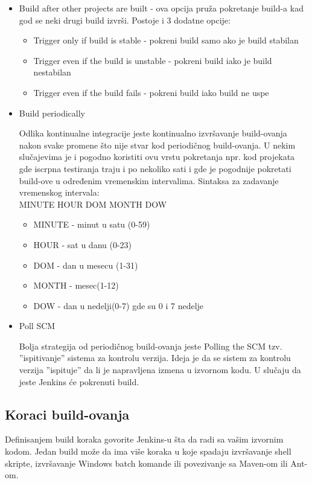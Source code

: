 \begin{itemize}
  
\item Build after other projects are built - ova opcija pruža pokretanje build-a kad god se neki drugi build izvrši. Postoje i 3 dodatne opcije:
\begin{itemize}  
\item Trigger only if build is stable - pokreni build samo ako je build stabilan
\item Trigger even if the build is unstable - pokreni build iako je build nestabilan
\item Trigger even if the build fails - pokreni build iako build ne uspe
\end{itemize}

\item Build periodically

Odlika kontinualne integracije jeste kontinualno izvršavanje build-ovanja nakon svake promene što nije stvar kod periodičnog build-ovanja. U nekim slučajevima je i pogodno koristiti ovu vrstu pokretanja npr. kod projekata gde iscrpna testiranja traju i po nekoliko sati i gde je pogodnije pokretati build-ove u određenim vremenskim intervalima.
Sintaksa za zadavanje vremenskog intervala: \\
MINUTE HOUR DOM MONTH DOW
\begin{itemize}
\item MINUTE - minut u satu (0-59)
\item HOUR - sat u danu (0-23)
\item DOM - dan u mesecu (1-31)
\item MONTH - mesec(1-12)
\item DOW - dan u nedelji(0-7) gde su 0 i 7 nedelje
\end{itemize}

\item Poll SCM

Bolja strategija od periodičnog build-ovanja jeste Polling the SCM tzv. ''ispitivanje'' sistema za kontrolu verzija. Ideja je da se sistem za kontrolu verzija ''ispituje'' da li je napravljena izmena u izvornom kodu. U slučaju da jeste Jenkins će pokrenuti build.
\end{itemize}

\subsection{Koraci build-ovanja}

Definisanjem build koraka govorite Jenkins-u šta da radi sa vašim izvornim kodom. Jedan build može da ima više koraka u koje spadaju izvršavanje shell skripte, izvršavanje Windows batch komande ili povezivanje sa Maven-om ili Ant-om.


